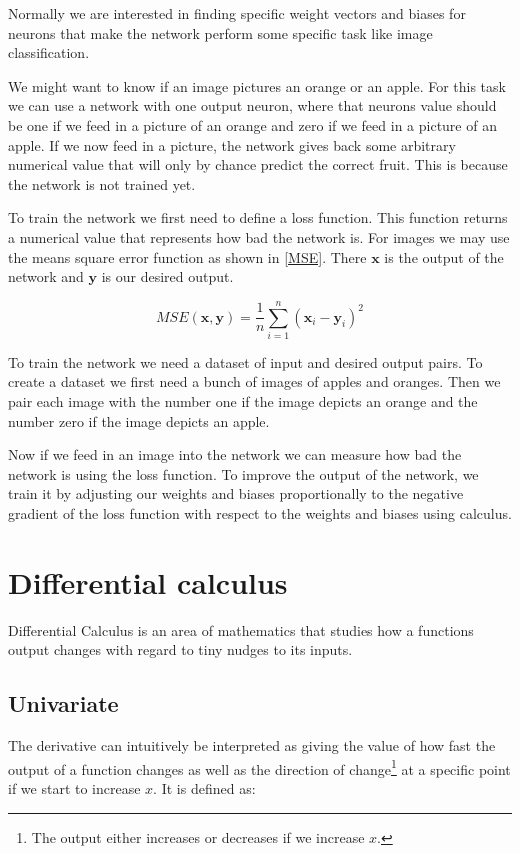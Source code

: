 Normally we are interested in finding specific weight vectors and biases for neurons that make the network perform some specific task like image classification.

We might want to know if an image pictures an orange or an apple. For this task we can use a network with one output neuron, where that neurons value should be one if we feed in a picture of an orange and zero if we feed in a picture of an apple. If we now feed in a picture, the network gives back some arbitrary numerical value that will only by chance predict the correct fruit. This is because the network is not trained yet.

To train the network we first need to define a loss function. This function returns a numerical value that represents how bad the network is. For images we may use the means square error function as shown in \cref{MSE}. There $\bm{x}$ is the output of the network and $\bm{y}$ is our desired output.

\begin{equation}
	MSE(\bm{x}, \bm{y}) = \frac{1}{n}\sum_{i=1}^{n}{(\bm{x}_i - \bm{y}_i)^2}
	\label{MSE}
\end{equation}

To train the network we need a dataset of input and desired output pairs. To create a dataset we first need a bunch of images of apples and oranges. Then we pair each image with the number one if the image depicts an orange and the number zero if the image depicts an apple.

Now if we feed in an image into the network we can measure how bad the network is using the loss function. To improve the output of the network, we train it by adjusting our weights and biases proportionally to the negative gradient of the loss function with respect to the weights and biases using calculus.


\section{Differential calculus}
Differential Calculus is an area of mathematics that studies how a functions output changes with regard to tiny nudges to its inputs.


\subsection{Univariate}
The derivative can intuitively be interpreted as giving the value of how fast the output of a function changes as well as the direction of change\footnote{The output either increases or decreases if we increase $x$.} at a specific point if we start to increase $x$. It is defined as:

